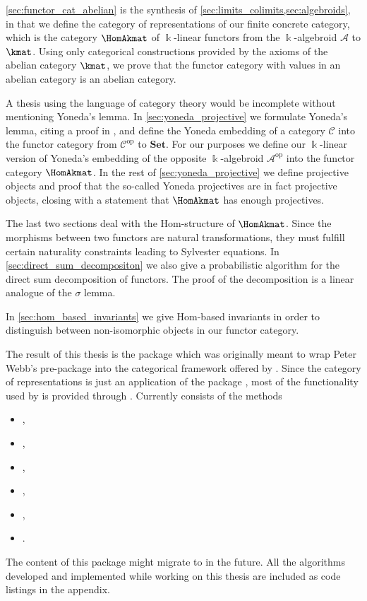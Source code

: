 \cref{sec:functor_cat_abelian} is the synthesis of \cref{sec:limits_colimits,sec:algebroids}, in that we define the category of representations
of our finite concrete category, which is the category $\HomAkmat$ of $\Bbbk$-linear functors from the $\Bbbk$-algebroid
$\mathcal{A}$ to $\kmat$. Using only categorical constructions provided by the axioms of the abelian category $\kmat$, we prove that
the functor category with values in an abelian category is an abelian category.

A thesis using the language of category theory would be incomplete without mentioning Yoneda's lemma. In \cref{sec:yoneda_projective} we
formulate Yoneda's lemma, citing a proof in \cite[2.2]{[context]}, and define the Yoneda embedding of a category $\mathcal{C}$ into the
functor category from $\mathcal{C}^{\text{op}}$ to $\mathbf{Set}$. For our purposes we
define our $\Bbbk$-linear version of Yoneda's embedding of the opposite $\Bbbk$-algebroid $\mathcal{A}^{\text{op}}$
into the functor category $\HomAkmat$. In the rest of \cref{sec:yoneda_projective} we define projective objects and proof that
the so-called Yoneda projectives are in fact projective objects, closing with a statement that $\HomAkmat$ has enough projectives.

The last two sections deal with the $\mathrm{Hom}$-structure of $\HomAkmat$. Since the morphisms between two
functors are natural transformations, they must fulfill certain naturality constraints leading to Sylvester equations. 
In \cref{sec:direct_sum_decompositon} we also give a probabilistic algorithm for the direct sum decomposition of functors.
The proof of the decomposition is a linear analogue of the $\sigma$ lemma.

In \cref{sec:hom_based_invariants} we give $\mathrm{Hom}$-based invariants in order to distinguish between non-isomorphic
objects in our functor category.

The result of this thesis is the \Gap package \CatReps \cite{[CatReps]} which was originally meant to wrap Peter Webb's
pre-package \catreps \cite{[Webb2020]} into the categorical framework offered by \CAP \cite{[CAP]}. Since the category of representations is just an application of
the package \FunctorCategories \cite{[FunctorCat]}, most of the functionality used by \CatReps is provided through \FunctorCategories.
Currently \CatReps consists of the methods
\begin{itemize}
\item {},
\item {},
\item {},
\item {},
\item {},
\item {}.
\end{itemize}
The content of this package might migrate to \FunctorCategories in the future. All the algorithms developed and implemented while
working on this thesis are included as code listings in the appendix.
